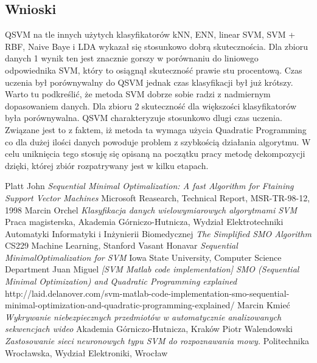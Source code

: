 \documentclass[[10pt,a4paper]{article}
\begin{document}
\begin{enumerate}
 \subsection{Wnioski}
 QSVM na tle innych użytych klasyfikatorów kNN, ENN, linear SVM, SVM + RBF, Naive Baye i LDA wykazał się stosunkowo dobrą skutecznościa. Dla zbioru danych 1 wynik ten jest znacznie gorszy w porównaniu do liniowego odpowiednika SVM, który to osiągnął skuteczność prawie stu procentową. Czas uczenia był porównywalny do QSVM jednak czas klasyfikacji był już krótszy. Warto tu podkreślić, że metoda SVM dobrze sobie radzi z nadmiernym dopasowaniem danych. Dla zbioru 2 skuteczność dla większości klasyfikatorów była porównywalna. 
 \newline QSVM charakteryzuje stosunkowo dlugi czas uczenia. Związane jest to z faktem, iż metoda ta wymaga użycia Quadratic Programming co dla dużej ilości danych powoduje problem z szybkością działania algorytmu. W celu uniknięcia tego stosuję się opisaną na początku pracy metodę dekompozycji dzięki, której  zbiór rozpatrywany jest w kilku etapach. 
\newpage

\begin{thebibliography}{10}
	
	Platt John
	\textit{Sequential Minimal Optimalization: A fast Algorithm for Ftaining Support Vector Machines} 
	Microsoft Reasearch, Technical Report, MSR-TR-98-12, 1998
	Marcin Orchel
	\textit{Klasyfikacja danych wielowymiarowych algorytmami SVM} 
	Praca magisterska, Akademia Górniczo-Hutnicza, Wydział Elektrotechniki Automatyki Informatyki i Inżynierii Biomedycznej
	\textit{The Simplified SMO Algorithm} 
	 CS229 Machine Learning, Stanford
	Vasant Honavar 
	\textit{Sequential MinimalOptimalization for SVM} 
	Iowa State University, Computer Science Department 
	Juan Miguel 
	\textit{[SVM Matlab code implementation] SMO (Sequential Minimal Optimization) and Quadratic Programming explained} 
	http://laid.delanover.com/svm-matlab-code-implementation-smo-sequential-minimal-optimization-and-quadratic-programming-explained/
	Marcin Kmieć
	\textit{Wykrywanie niebezpiecznych przedmiotów w automatycznie
analizowanych sekwencjach wideo} 
	  Akademia Górniczo-Hutnicza, Kraków
	  Piotr Walendowski
	\textit{Zastosowanie sieci neuronowych typu SVM do
rozpoznawania mowy.} 
	  Politechnika Wrocławska, Wydział Elektroniki, Wrocław
\end{thebibliography}

\end{enumerate}
\end{document}
